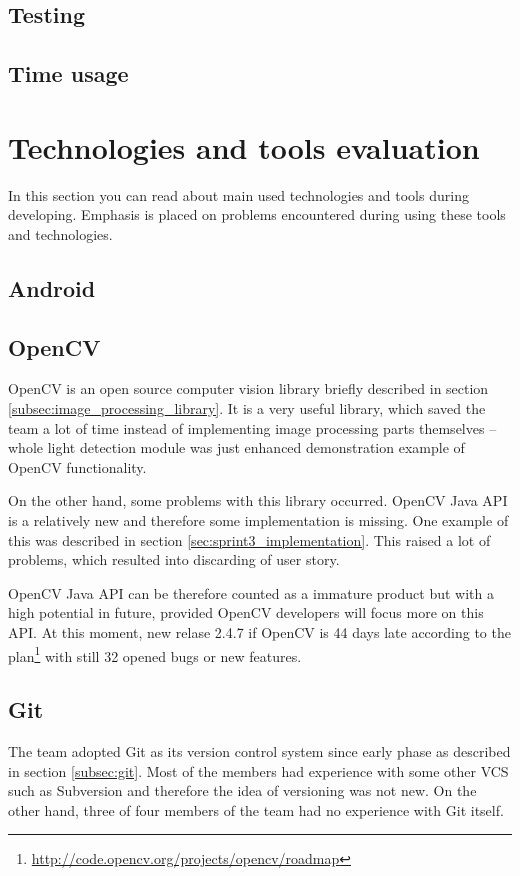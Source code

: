 \subsection{Testing}
\subsection{Time usage}
\section{Technologies and tools evaluation}
In this section you can read about main used technologies and tools during developing.
Emphasis is placed on problems encountered during using these tools and technologies.

\subsection{Android}

\subsection{OpenCV}
OpenCV is an open source computer vision library briefly described in section \ref{subsec:image_processing_library}.
It is a very useful library, which saved the team a lot of time instead of implementing image processing parts themselves
 -- whole light detection module was just enhanced demonstration example of OpenCV functionality.

On the other hand, some problems with this library occurred.
OpenCV Java API is a relatively new and therefore some implementation is missing.
One example of this was described in section \ref{sec:sprint3_implementation}.
This raised a lot of problems, which resulted into discarding of user story.

OpenCV Java API can be therefore counted as a immature product but with a high potential in future, provided OpenCV developers will focus more on this API.
At this moment, new relase 2.4.7 if OpenCV is 44 days late according to the plan\footnote{\url{http://code.opencv.org/projects/opencv/roadmap}} with still 32 opened bugs or new features.

\subsection{Git}
The team adopted Git as its version control system since early phase as described in section \ref{subsec:git}.
Most of the members had experience with some other VCS such as Subversion and therefore the idea of versioning was not new.
On the other hand, three of four members of the team had no experience with Git itself.

